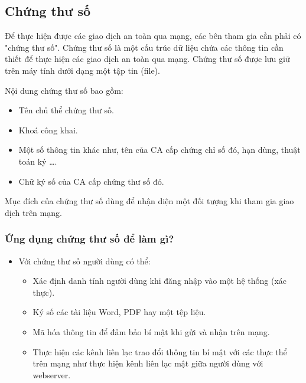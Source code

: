 \documentclass[a4paper,12pt]{report}
\begin{document}
\subsection*{Chứng thư số}
Để thực hiện được các giao dịch an toàn qua mạng, các bên tham gia cần phải có "chứng thư số". Chứng thư số là một cấu trúc dữ liệu chứa các thông tin cần thiết để thực hiện các giao dịch an toàn qua mạng. Chứng thư số được lưu giữ trên máy tính dưới dạng một tập tin (file).

Nội dung chứng thư số bao gồm:
\begin{itemize}
\item Tên chủ thể chứng thư số.
\item Khoá công khai.
\item Một số thông tin khác như, tên của CA cấp chứng chỉ số đó, hạn dùng, thuật toán ký \ldots.
\item Chữ ký số của CA cấp chứng thư số đó.
\end{itemize}

Mục đích của chứng thư số dùng để nhận diện một đối tượng khi tham gia giao dịch trên mạng.

\subsubsection{Ứng dụng chứng thư số để làm gì?}
\begin{itemize}
\item Với chứng thư số người dùng có thể:
\begin{itemize}
\item Xác định danh tính người dùng khi đăng nhập vào một hệ thống (xác thực).
\item Ký số các tài liệu Word, PDF hay một tệp liệu.
\item Mã hóa thông tin để đảm bảo bí mật khi gửi và nhận trên mạng.
\item Thực hiện các kênh liên lạc trao đổi thông tin bí mật với các thực thể trên mạng như thực hiện kênh liên lạc mật giữa người dùng với webserver.
\end{itemize}
\end{itemize}
\end{document}
